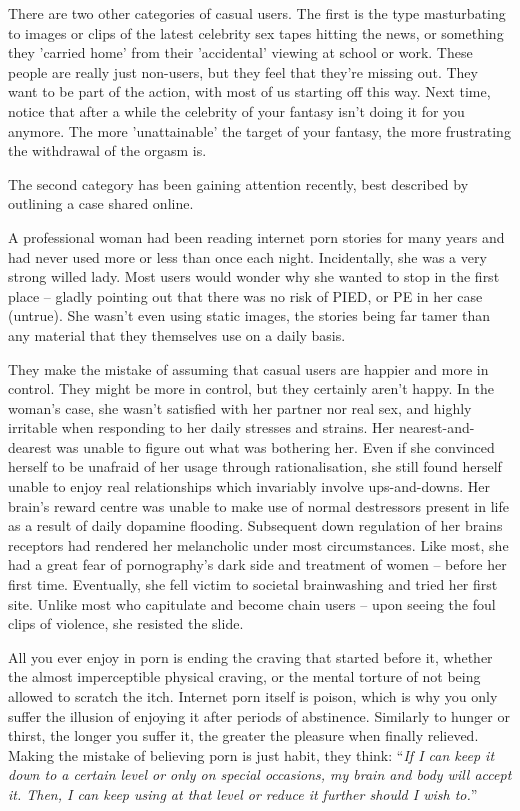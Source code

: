 \documentclass[
]{book}
\begin{document}
There are two other categories of casual users. The first is the type masturbating to images or clips of the latest celebrity sex tapes hitting the news, or something they 'carried home' from their 'accidental' viewing at school or work. These people are really just non-users, but they feel that they're missing out. They want to be part of the action, with most of us starting off this way. Next time, notice that after a while the celebrity of your fantasy isn't doing it for you anymore. The more 'unattainable' the target of your fantasy, the more frustrating the withdrawal of the orgasm is.

The second category has been gaining attention recently, best described by outlining a case shared online.

A professional woman had been reading internet porn stories for many years and had never used more or less than once each night. Incidentally, she was a very strong willed lady. Most users would wonder why she wanted to stop in the first place -- gladly pointing out that there was no risk of PIED, or PE in her case (untrue). She wasn't even using static images, the stories being far tamer than any material that they themselves use on a daily basis.

They make the mistake of assuming that casual users are happier and more in control. They might be more in control, but they certainly aren't happy. In the woman's case, she wasn't satisfied with her partner nor real sex, and highly irritable when responding to her daily stresses and strains. Her nearest-and-dearest was unable to figure out what was bothering her. Even if she convinced herself to be unafraid of her usage through rationalisation, she still found herself unable to enjoy real relationships which invariably involve ups-and-downs. Her brain's reward centre was unable to make use of normal destressors present in life as a result of daily dopamine flooding. Subsequent down regulation of her brains receptors had rendered her melancholic under most circumstances. Like most, she had a great fear of pornography's dark side and treatment of women -- before her first time. Eventually, she fell victim to societal brainwashing and tried her first site. Unlike most who capitulate and become chain users -- upon seeing the foul clips of violence, she resisted the slide.

All you ever enjoy in porn is ending the craving that started before it, whether the almost imperceptible physical craving, or the mental torture of not being allowed to scratch the itch. Internet porn itself is poison, which is why you only suffer the illusion of enjoying it after periods of abstinence. Similarly to hunger or thirst, the longer you suffer it, the greater the pleasure when finally relieved. Making the mistake of believing porn is just habit, they think: ``\emph{If I can keep it down to a certain level or only on special occasions, my brain and body will accept it. Then, I can keep using at that level or reduce it further should I wish to.}''
\end{document}
